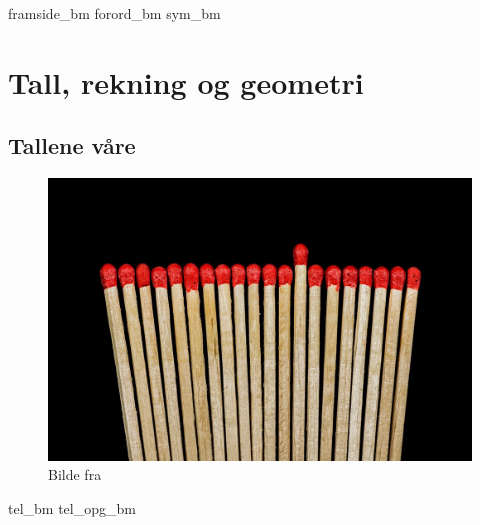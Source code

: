 




\addto\captionsenglish{\renewcommand{\figurename}{Figur}}
\makeatletter
\addto\captionsenglish{\renewcommand{\chaptername}{Kapittel}}
\addto\captionsenglish{\renewcommand{\partname}{Del}}
\addto\captionsenglish{\renewcommand{\contentsname}{Innhold}}


	

{framside_bm}
{forord_bm}
{sym_bm}
\newpage

{\footnotesize \tableofcontents}
\newpage
\part{Tall, rekning og geometri}

\chapter{Tallene våre \label{Talavare}}
\begin{figure}
	\centering
	\includegraphics[scale=0.25]{sticks} \\
	{\footnotesize Bilde fra } 
\end{figure}
\newpage
{tel_bm}
{tel_opg_bm}

